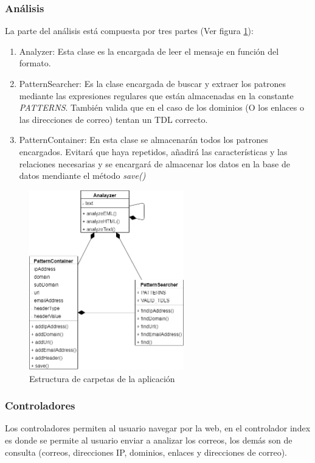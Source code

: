 \subsubsection{Análisis}
La parte del análisis está compuesta por tres partes (Ver figura \ref{fig:DC_anslisis}):
\begin{enumerate}
    \item Analyzer: Esta clase es la encargada de leer el mensaje en función del formato. 
    \item PatternSearcher: Es la clase encargada de buscar y extraer los patrones mediante las expresiones regulares que están almacenadas en la constante \textit{PATTERNS}. También valida que en el caso de los dominios (O los enlaces o las direcciones de correo) tentan un TDL correcto. 
    \item PatternContainer: En esta clase se almacenarán todos los patrones encargados. Evitará que haya repetidos, añadirá las características y las relaciones necesarias y se encargará de almacenar los datos en la base de datos mendiante el método \textit{save()} 
\end{enumerate}

\begin{figure}[htb]
    \centering
    \includegraphics[width=0.6\textwidth]{imagenes/DiagramasClases/Analizador.png}
\caption{Estructura de carpetas de la aplicación}
\label{fig:DC_anslisis}
\end{figure}

\subsubsection{Controladores}
Los controladores permiten al usuario navegar por la web, en el controlador index es donde se permite al usuario enviar a analizar los correos, los demás son de consulta (correos, direcciones IP, dominios, enlaces y direcciones de correo).

